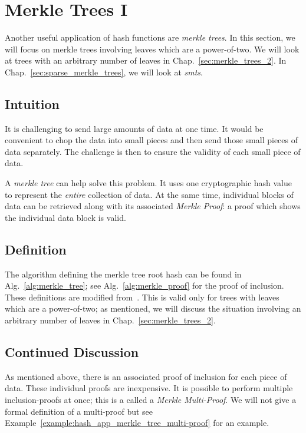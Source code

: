 \section{Merkle Trees I}
\label{sec:merkle_trees}

Another useful application of \glspl{hash function} are
\emph{\glspl{merkle tree}}.
In this section, we will focus on \glspl{merkle tree} involving
leaves which are a power-of-two.
We will look at trees with an arbitrary number of leaves in
Chap.~\ref{sec:merkle_trees_2}.
In Chap.~\ref{sec:sparse_merkle_trees},
we will look at \emph{\glspl{smt}}.

\subsection{Intuition}

It is challenging to send large amounts of data at one time.
It would be convenient to chop the data into small pieces
and then send those small pieces of data separately.
The challenge is then to ensure the validity of each small
piece of data.

A \emph{\gls{merkle tree}} can help solve this problem.
It uses one cryptographic hash value to represent the \emph{entire}
collection of data.
At the same time, individual blocks of data can be retrieved
along with its associated \emph{Merkle Proof}:
a proof which shows the individual data block is valid.

\subsection{Definition}

The algorithm defining the \gls{merkle tree} root hash can be found in
Alg.~\ref{alg:merkle_tree};
see Alg.~\ref{alg:merkle_proof} for the proof of inclusion.
These definitions are modified
from~\cite[Chapter 8.9]{BonehShoupGraduateApplied}.
This is valid only for trees with leaves
which are a power-of-two;
as mentioned, we will discuss the situation involving
an arbitrary number of leaves in Chap.~\ref{sec:merkle_trees_2}.




\subsection{Continued Discussion}

As mentioned above, there is an associated proof of inclusion
for each piece of data.
These individual proofs are inexpensive.
It is possible to perform multiple inclusion-proofs at once;
this is a called a \emph{Merkle Multi-Proof}.
We will not give a formal definition of a multi-proof
but see Example~\ref{example:hash_app_merkle_tree_multi-proof}
for an example.

